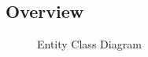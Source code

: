 \subsection{Overview}

\begin{sidewaysfigure}
\begin{figure}[H]
\caption{Entity Class Diagram}
\label{fig:Class}
\centering

\end{figure}
\end{sidewaysfigure}

